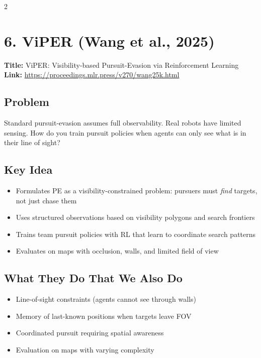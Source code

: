 \documentclass[10pt,a4paper]{article}
\begin{document}
\begin{multicols}{2}
\section{6. ViPER (Wang et al., 2025)}

\textbf{Title:} ViPER: Visibility-based Pursuit-Evasion via Reinforcement Learning \\
\textbf{Link:} \url{https://proceedings.mlr.press/v270/wang25k.html}

\subsection{Problem}
Standard pursuit-evasion assumes full observability. Real robots have limited sensing. How do you train pursuit policies when agents can only see what is in their line of sight?

\subsection{Key Idea}
\begin{itemize}
\item Formulates PE as a visibility-constrained problem: pursuers must \textit{find} targets, not just chase them
\item Uses structured observations based on visibility polygons and search frontiers
\item Trains team pursuit policies with RL that learn to coordinate search patterns
\item Evaluates on maps with occlusion, walls, and limited field of view
\end{itemize}

\subsection{What They Do That We Also Do}
\begin{itemize}
\item Line-of-sight constraints (agents cannot see through walls)
\item Memory of last-known positions when targets leave FOV
\item Coordinated pursuit requiring spatial awareness
\item Evaluation on maps with varying complexity
\end{itemize}


\end{multicols}
\end{document}
